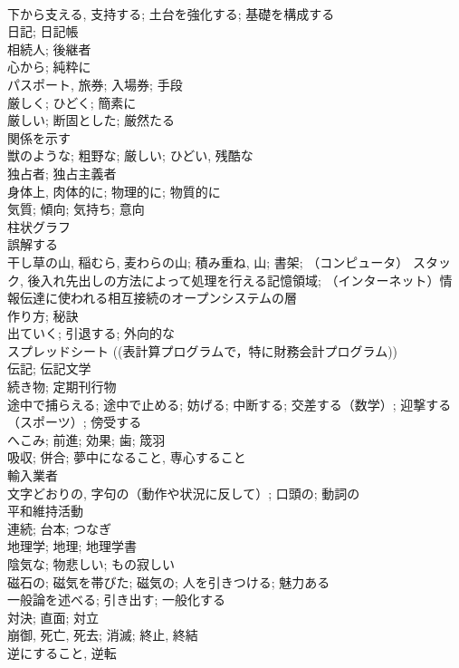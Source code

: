 \documentclass[8pt]{extreport}
\begin{document}
\begin{CJK}{UTF8}{min}
\\	下から支える, 支持する; 土台を強化する; 基礎を構成する	
\\	日記; 日記帳	
\\	相続人; 後継者	
\\	心から; 純粋に	
\\	パスポート, 旅券; 入場券; 手段	
\\	厳しく; ひどく; 簡素に	
\\	厳しい; 断固とした; 厳然たる	
\\	関係を示す	
\\	獣のような; 粗野な; 厳しい; ひどい, 残酷な	
\\	独占者; 独占主義者	
\\	身体上, 肉体的に; 物理的に; 物質的に	
\\	気質; 傾向; 気持ち; 意向	
\\	柱状グラフ	
\\	誤解する	
\\	干し草の山, 稲むら, 麦わらの山; 積み重ね, 山; 書架; （コンピュータ） スタック, 後入れ先出しの方法によって処理を行える記憶領域; （インターネット）情報伝達に使われる相互接続のオープンシステムの層	
\\	作り方; 秘訣	
\\	出ていく; 引退する; 外向的な	
\\	スプレッドシート ((表計算プログラムで，特に財務会計プログラム))	
\\	伝記; 伝記文学	
\\	続き物; 定期刊行物	
\\	途中で捕らえる; 途中で止める; 妨げる; 中断する; 交差する（数学）; 迎撃する（スポーツ）; 傍受する	
\\	へこみ; 前進; 効果; 歯; 筬羽	
\\	吸収; 併合; 夢中になること, 専心すること	
\\	輸入業者	
\\	文字どおりの, 字句の（動作や状況に反して）; 口頭の; 動詞の	
\\	平和維持活動	
\\	連続; 台本; つなぎ	
\\	地理学; 地理; 地理学書	
\\	陰気な; 物悲しい; もの寂しい	
\\	磁石の; 磁気を帯びた; 磁気の; 人を引きつける; 魅力ある	
\\	一般論を述べる; 引き出す; 一般化する	
\\	対決; 直面; 対立	
\\	崩御, 死亡, 死去; 消滅; 終止, 終結	
\\	逆にすること, 逆転	

\end{CJK}
\end{document}
